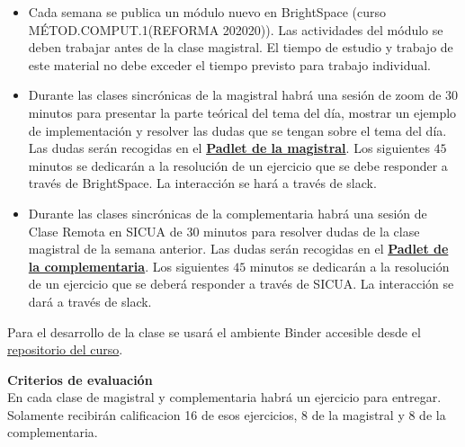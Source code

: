 \documentclass[letterpaper,10pt,onecolumn]{article}
\begin{document}
\begin{itemize}
    \item Cada semana se publica un m\'odulo nuevo en BrightSpace (curso MÉTOD.COMPUT.1(REFORMA 202020)). 
      Las actividades del m\'odulo se deben trabajar antes de la clase magistral. 
      El tiempo de estudio y trabajo de este material no debe exceder
      el tiempo previsto para trabajo individual. 
    \item Durante las clases sincr\'onicas de la magistral habr\'a una
      sesi\'on de zoom de $30$ minutos para presentar la parte
      te\'orical del tema del d\'ia, mostrar un ejemplo de implementaci\'on
      y resolver las dudas que se tengan sobre el tema
      del d\'ia.
      Las dudas ser\'an recogidas en el 
      \textbf{\href{https://uniandes.padlet.org/jeforero/dddxuuqa7q4cadgs}{Padlet
        de la magistral}}.
      Los siguientes $45$ minutos se dedicar\'an a la resoluci\'on de
      un ejercicio que se debe responder a trav\'es de BrightSpace. La
      interacci\'on se har\'a a trav\'es de slack. 
    \item
      Durante las clases sincr\'onicas de la complementaria habr\'a
      una sesi\'on de Clase Remota en SICUA de
      $30$ minutos para resolver dudas de la clase magistral de la
      semana anterior.
      Las dudas ser\'an recogidas en el
      \textbf{\href{https://uniandes.padlet.org/jfsuarez/vj0aroqbr0kw9fmq}{Padlet
        de la complementaria}}.
      Los siguientes $45$ minutos se dedicar\'an a la resoluci\'on de
      un ejercicio que se deber\'a responder a trav\'es de SICUA. 
      La interacci\'on se dar\'a a trav\'es de slack. 
\end{itemize}

Para el desarrollo de la clase se usará el ambiente Binder accesible
desde el
\href{https://github.com/ComputoCienciasUniandes/MetComp1_202020}{repositorio
  del curso}. 




\vspace*{0.5cm} 
\noindent\textbf{\large {} \quad Criterios de
  evaluaci\'on}\\[-0.2cm] 

En cada clase de magistral y complementaria habr\'a un ejercicio para
entregar. 
Solamente recibir\'an calificacion 16  de esos
ejercicios, 8 de la magistral y 8 de la complementaria.
\end{document}
